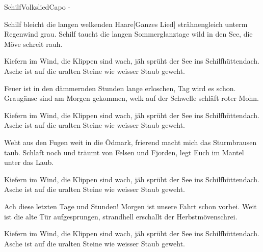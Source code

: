\begin{song}{Schilf}{Volkslied}{Capo -}

Schilf bleicht die langen welkenden Haare[Ganzes Lied]
strähnengleich unterm Regenwind grau.
Schilf taucht die langen Sommerglanztage
wild in den See, die Möve schreit rauh.

Kiefern im Wind, die Klippen sind wach,
jäh sprüht der See ins Schilfhüttendach.
Asche ist auf die uralten Steine
wie weisser Staub geweht.

Feuer ist in den dämmernden Stunden
lange erloschen, Tag wird es schon.
Graugänse sind am Morgen gekommen,
welk auf der Schwelle schläft roter Mohn.

Kiefern im Wind, die Klippen sind wach,
jäh sprüht der See ins Schilfhüttendach.
Asche ist auf die uralten Steine
wie weisser Staub geweht.

Weht aus den Fugen weit in die Ödmark,
frierend macht mich das Sturmbrausen taub.
Schlaft noch und träumt von Felsen und Fjorden,
legt Euch im Mantel unter das Laub.

Kiefern im Wind, die Klippen sind wach,
jäh sprüht der See ins Schilfhüttendach.
Asche ist auf die uralten Steine
wie weisser Staub geweht.

Ach diese letzten Tage und Stunden!
Morgen ist unsere Fahrt schon vorbei.
Weit ist die alte Tür aufgesprungen,
strandhell erschallt der Herbstmövenschrei.

Kiefern im Wind, die Klippen sind wach,
jäh sprüht der See ins Schilfhüttendach.
Asche ist auf die uralten Steine
wie weisser Staub geweht.
\end{song}
